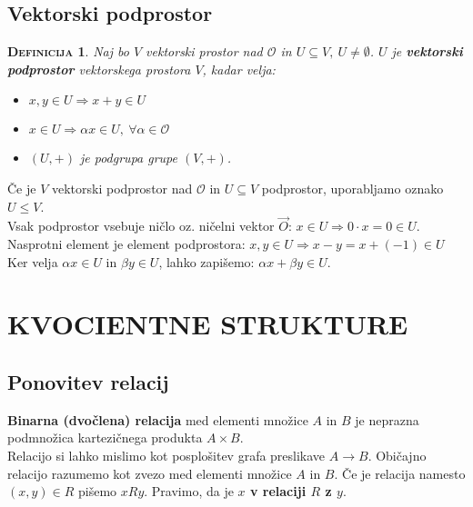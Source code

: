 \documentclass[a4paper,12pt]{article}
\newtheorem*{definicija}{\textsc{Definicija}}
\begin{document}
\newpage 

\subsection{Vektorski podprostor}

\begin{definicija}
	Naj bo $V$ vektorski prostor nad $\mathcal{O}$ in $U\subseteq V,~U\neq \emptyset$. $U$ je \textbf{vektorski podprostor} vektorskega prostora $V$, kadar velja:
	\begin{itemize}
		\item $x,y\in U \Rightarrow x+y\in U$
		\item $x\in U \Rightarrow \alpha x\in U,~\forall \alpha \in \mathcal{O}$ 
		\item $(U,+)$ je podgrupa grupe $(V,+)$.\\
	\end{itemize}
\end{definicija}

Če je $V$ vektorski podprostor nad $\mathcal{O}$ in $U\subseteq V$ podprostor, uporabljamo oznako $U \leq V$. \\

Vsak podprostor vsebuje ničlo oz. ničelni vektor $\vec{O}$: $x\in U \Rightarrow 0\cdot x=0 \in U$. \\

Nasprotni element je element podprostora: $x,y\in U \Rightarrow x-y=x+(-1)\in U$ \\

Ker velja $\alpha x\in U$ in $\beta y\in U$, lahko zapišemo: $\alpha x +\beta y\in U$.


\newpage

\section{KVOCIENTNE STRUKTURE}

\subsection{Ponovitev relacij}

\textbf{Binarna (dvočlena) relacija} med elementi množice $A$ in $B$ je neprazna podmnožica kartezičnega produkta $A\times B$.\\

Relacijo si lahko mislimo kot posplošitev grafa preslikave $A\to B$. Običajno relacijo razumemo kot zvezo med elementi množice $A$ in $B$. Če je relacija namesto $(x,y)\in R$ pišemo $xRy$. Pravimo, da je \textbf{$x$ v relaciji $R$ z $y$}. \\
\end{document}
